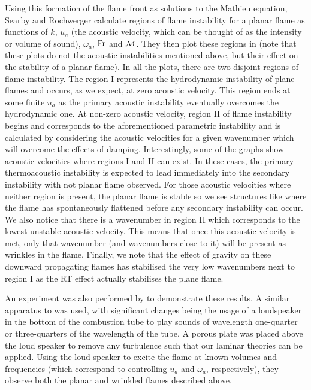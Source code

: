 Using this formation of the flame front as solutions to the Mathieu equation, Searby and Rochwerger \cite{searby1991ParametricAcousticInstability} calculate regions of flame instability for a planar flame as functions of $k$, $u_a$ (the acoustic velocity, which can be thought of as the intensity or volume of sound), $ω_a$, $\mathrm{Fr}$ and $\mathcal{M}$. They then plot these regions in  (note that these plots do not the acoustic instabilities mentioned above, but their effect on the stability of a planar flame). In all the plots, there are two disjoint regions of flame instability. The region I represents the hydrodynamic instability of plane flames and occurs, as we expect, at zero acoustic velocity. This region ends at some finite $u_a$ as the primary acoustic instability eventually overcomes the hydrodynamic one. At non-zero acoustic velocity, region II of flame instability begins and corresponds to the aforementioned parametric instability and is calculated by considering the acoustic velocities for a given wavenumber which will overcome the effects of damping. Interestingly, some of the graphs show acoustic velocities where regions I and II can exist. In these cases, the primary thermoacoustic instability is expected to lead immediately into the secondary instability with not planar flame observed. For those acoustic velocities where neither region is present, the planar flame is stable so we see structures like  where the flame has spontaneously flattened before any secondary instability can occur. We also notice that there is a wavenumber in region II which corresponds to the lowest unstable acoustic velocity. This means that once this acoustic velocity is met, only that wavenumber (and wavenumbers close to it) will be present as wrinkles in the flame. Finally, we note that the effect of gravity on these downward propagating flames has stabilised the very low wavenumbers next to region I as the RT effect actually stabilises the plane flame.

An experiment was also performed by \cite{searby1991ParametricAcousticInstability} to demonstrate these results. A similar apparatus to  was used, with significant changes being the usage of a loudspeaker in the bottom of the combustion tube to play sounds of wavelength one-quarter or three-quarters of the wavelength of the tube. A porous plate was placed above the loud speaker to remove any turbulence such that our laminar theories can be applied. Using the loud speaker to excite the flame at known volumes and frequencies (which correspond to controlling $u_a$ and $ω_a$, respectively), they observe both the planar and wrinkled flames described above.





